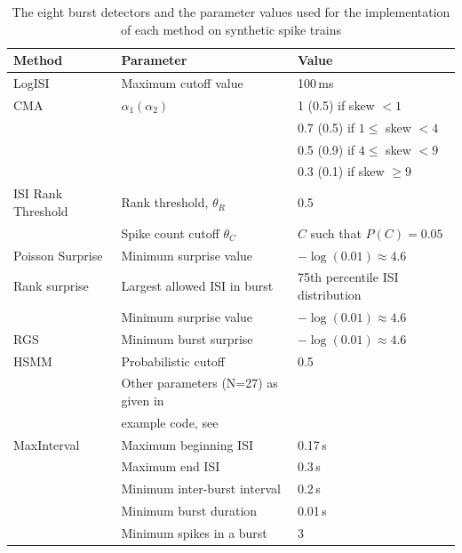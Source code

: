 \documentclass[12pt, titlepage]{article}
\begin{document}
 \begin{table}[h]
 	\centering
 	\begin{tabular}{|l|l|l|}
 		\hline
 		Method & Parameter & Value
 		\\ \hline 
 		\rowcolor{Gray} LogISI \cite{Pasquale2010} & Maximum cutoff value & 100$\,$ms
 		\\ \hline
 		CMA \cite{Kapucu2012} & $\alpha_1 (\alpha_2)$ & 1 (0.5) if skew $<1$
 		\\ & &  0.7 (0.5) if $1 \leq $ skew $<4$
 		\\ & & 0.5 (0.9) if $4 \leq $ skew $<9$
 		\\ & & 0.3 (0.1) if  skew $\geq 9$
 		\\ \hline 
 		\rowcolor{Gray}	ISI Rank Threshold \cite{Hennig2011} & Rank threshold, $\theta_R$ & 0.5 
 		\\ \rowcolor{Gray}& Spike count cutoff $\theta_C$& $C$ such that $P(C)=0.05 $
 		\\ \hline 
 		Poisson Surprise \cite{Legendy1985} & Minimum surprise value & $-\log(0.01) \approx 4.6$
 		\\ \hline 
 		\rowcolor{Gray} Rank surprise \cite{Gourevitch2007} & Largest allowed ISI in burst & 75th percentile ISI distribution
 		\\ \rowcolor{Gray} & Minimum surprise value& $-\log(0.01) \approx 4.6$
 		\\ \hline 
 		RGS \cite{Ko2012} & Minimum burst surprise & $-\log(0.01) \approx 4.6$
 		\\ \hline
 		\rowcolor{Gray} HSMM \cite{Tokdar2010} & Probabilistic cutoff & 0.5
 		\\ \rowcolor{Gray} & Other parameters (N=27) as given in &
 		\\ \rowcolor{Gray} &  example code, see \cite{Tokdar2010} & 
 		\\ \hline
 		MaxInterval \cite{NEmanual} & Maximum beginning ISI & 0.17$\,$s
 		\\ & Maximum end ISI & 0.3$\,$s
 		\\ & Minimum inter-burst interval & 0.2$\,$s
 		\\ & Minimum burst duration & 0.01$\,$s
 		\\& Minimum spikes in a burst & 3
 		\\ \hline
 	\end{tabular}
 	\caption{The eight burst detectors and the parameter values used for the implementation of each method on synthetic spike trains}
 	\label{param_vals}
 \end{table}
\end{document}
